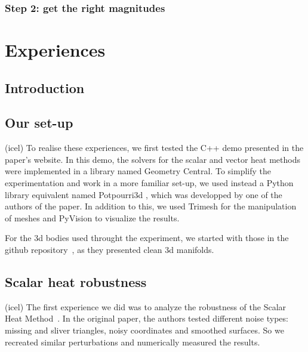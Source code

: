 \documentclass[sigconf]{acmart}
\begin{document}
\subsubsection{Step 2: get the right magnitudes}

\section{Experiences}
\subsection{Introduction}

\subsection{Our set-up}
(icel)
To realise these experiences, we first tested the C++ demo presented in the paper's website.
In this demo, the solvers for the scalar and vector heat methods were implemented in a library named Geometry Central.
To simplify the experimentation and work in a more familiar set-up, we used instead a Python library equivalent named Potpourri3d \cite{library_potpourri3d}, 
which was developped by one of the authors of the paper.
In addition to this, we used Trimesh for the manipulation of meshes and PyVision to visualize the results.

For the 3d bodies used throught the experiment, we started with those in the github repository~\cite{github_objects_repo},
as they presented clean 3d manifolds.

\subsection{Scalar heat robustness}
(icel)
The first experience we did was to analyze the robustness of the Scalar Heat Method~\cite{Crane:2017:HMD}. In
the original paper, the authors tested different noise types: missing and sliver triangles,
noisy coordinates and smoothed surfaces. So we recreated similar perturbations and numerically
measured the results.
\end{document}
